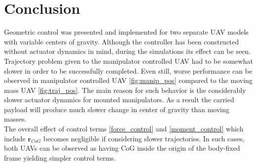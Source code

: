 \section{Conclusion}

Geometric control was presented and implemented for two separate UAV models with variable centers of gravity. Although the controller has been constructed without actuator dynamics in mind, during the simulations its effect can be seen. Trajectory problem given to the manipulator controlled UAV had to be somewhat slower in order to be successfully completed. Even still, worse performance can be observed in manipulator controlled UAV \ref{fig:manip_pos} compared to the moving mass UAV \ref{fig:traj_pos}. The main reason for such behavior is the considerably slower actuator dynamics for mounted manipulators. As a result the carried payload will produce much slower change in center of gravity than moving masses. \\
The overall effect of control terms \ref{force_control} and \ref{moment_control} which include $\textbf{r}_{CoG}$ becomes negligible if considering slower trajectories. In such cases, both UAVs can be observed as having CoG inside the origin of the body-fixed frame yielding simpler control terms.